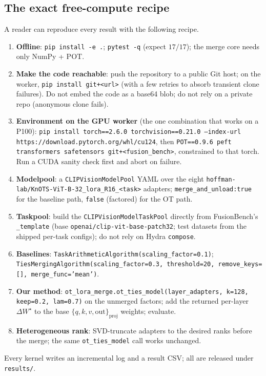 \documentclass[11pt]{article}
\newcommand{\dW}{\Delta W}
\begin{document}
\subsection{The exact free-compute recipe}
\label{app:recipe}
A reader can reproduce every result with the following recipe.
\begin{enumerate}[leftmargin=1.5em,itemsep=2pt]
\item \textbf{Offline}: \texttt{pip install -e .}; \texttt{pytest -q} (expect $17/17$); the merge core
needs only NumPy + POT.
\item \textbf{Make the code reachable}: push the repository to a public Git host; on the worker,
\texttt{pip install git+<url>} (with a few retries to absorb transient clone failures). Do not embed the
code as a base64 blob; do not rely on a private repo (anonymous clone fails).
\item \textbf{Environment on the GPU worker} (the one combination that works on a P100):
\texttt{pip install torch==2.6.0 torchvision==0.21.0 --index-url
https://download.pytorch.org/whl/cu124}, then \texttt{POT==0.9.6 peft transformers safetensors
git+<fusion\_bench>}, constrained to that torch. Run a CUDA sanity check first and abort on failure.
\item \textbf{Modelpool}: a \texttt{CLIPVisionModelPool} YAML over the eight
\texttt{hoffman-lab/KnOTS-ViT-B-32\_lora\_R16\_<task>} adapters; \texttt{merge\_and\_unload:true} for the
baseline path, \texttt{false} (factored) for the OT path.
\item \textbf{Taskpool}: build the \texttt{CLIPVisionModelTaskPool} directly from FusionBench's
\texttt{\_template} (base \texttt{openai/clip-vit-base-patch32}; test datasets from the shipped per-task
configs); do not rely on Hydra \texttt{compose}.
\item \textbf{Baselines}: \texttt{TaskArithmeticAlgorithm(scaling\_factor=0.1)};
\texttt{TiesMergingAlgorithm(scaling\_factor=0.3, threshold=20, remove\_keys=[], merge\_func='mean')}.
\item \textbf{Our method}: \texttt{ot\_lora\_merge.ot\_ties\_model(layer\_adapters, k=128, keep=0.2,
lam=0.7)} on the unmerged factors; add the returned per-layer $\dW^\star$ to the base
$\{q,k,v,\text{out}\}_{\text{proj}}$ weights; evaluate.
\item \textbf{Heterogeneous rank}: SVD-truncate adapters to the desired ranks before the merge; the same
\texttt{ot\_ties\_model} call works unchanged.
\end{enumerate}
Every kernel writes an incremental log and a result CSV; all are released under \texttt{results/}.
\end{document}
